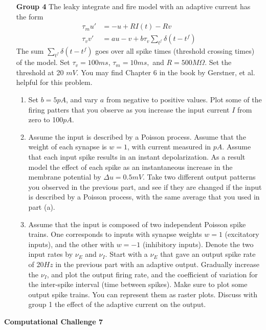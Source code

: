 \documentclass[12pt]{article}
\begin{document}
\begin{enumerate}
\item[\bf Group 4] 
The leaky integrate and fire model with an adaptive current has the form 
\begin{equation} \label{E:AdEIF}
\begin{split}
\tau_m u' &= - u  + R I(t)  - R v \\
\tau_v v' & = a u -v  + b \tau_v \sum_{t^f} \delta(t - t^f) 
\end{split}
 \end{equation}
The sum $\sum_{t^f} \delta(t - t^f)$ goes over all spike times (threshold crossing times) of the model.
 Set $\tau_v = 100ms$, $\tau_m = 10 ms,$ and $R = 500M \Omega$.  Set the threshold at 20 $mV$. 
 You may find Chapter 6 in the book by Gerstner, et al. helpful for this problem.

\begin{enumerate}
\item Set $ b = 5 pA$, and vary $a$ from negative to positive values. Plot some of the firing patters that you observe as you increase the input current $I$ 
from zero to 100$pA$. 
\item Assume the input is described by a Poisson process. Assume that the weight of each synapse is $w = 1$,
with current measured in $pA$.  Assume that each input spike results in an instant depolarization.  As a result model the effect of each spike as  an instantaneous increase in the membrane potential
by $\Delta u = 0.5mV$.  Take two different output patterns you observed in the previous part, and see if they are changed if the input is described by a Poisson process, with the same average that you used in part (a).
\item Assume that the input is composed of two independent Poisson spike trains.  One corresponds to inputs with synapse weights $w = 1$ (excitatory inputs), and the other with $w = -1$ (inhibitory inputs).  Denote the two input rates by $\nu_E$ and $\nu_I$. Start with a $\nu_E$ that gave an output spike rate of 20$Hz$ in the previous part with an adaptive output. Gradually increase the $\nu_I$, and plot the output firing rate, and the coefficient of variation for the inter-spike interval (time between spikes).  Make sure to plot some output spike trains. You can represent them as raster plots.  Discuss with group 1 the effect of the adaptive current on the output.
\end{enumerate}

\end{enumerate}


\begin{center}
{\Large \bf Computational Challenge 7
\\ \vskip5mm }
\end{center}
\end{document}
